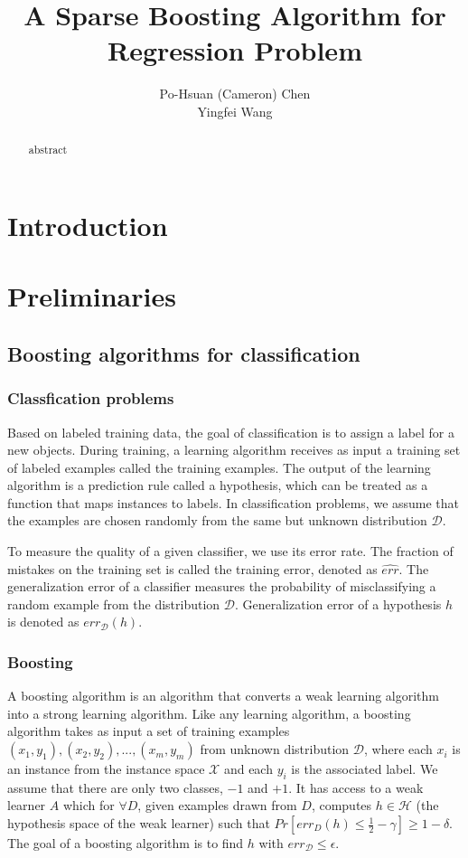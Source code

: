 \documentclass{article} %
\title{A Sparse Boosting Algorithm for Regression Problem}
\author{
 Po-Hsuan (Cameron) Chen \\
\And
Yingfei Wang \\
}
\begin{document}
\maketitle

\begin{abstract}
abstract
\end{abstract}

\section{Introduction}

\section{Preliminaries}

\subsection{Boosting algorithms for classification}
\subsubsection{Classfication problems}
Based on labeled training data, the goal of classification is to assign a label for a new objects. During training, a learning algorithm receives as input a training set of labeled examples
called the training examples. The output of the learning algorithm is a prediction rule called
a hypothesis, which can be treated as a function that maps instances to labels. In classification problems, we assume that the examples are chosen randomly from the same but unknown distribution $\mathcal{D}$.

To measure the quality of a given classifier, we use its error rate. The fraction of mistakes on the training set is called the training error, denoted as $\widehat{err}$.  The generalization error of a classifier measures the probability of misclassifying a random example from the distribution $\mathcal{D}$.  Generalization error of a hypothesis $h$ is denoted as $err_\mathcal{D}(h)$.
\subsubsection{Boosting}
A boosting algorithm is an algorithm that converts a weak learning algorithm
into a strong learning algorithm. Like any learning algorithm, a boosting algorithm takes as input a set of training examples $(x_1,y_1),(x_2,y_2),...,(x_m,y_m)$ from unknown distribution $\mathcal{D}$, where each $x_i$ is an instance from the instance space $\mathcal{X}$ and each $y_i$ is the associated label. We assume that there are only two classes, $-1$ and $+1$. It has access to a weak learner $A$ which for $\forall {D}$, given examples drawn from $D$,  computes $h \in \mathcal{H}$ (the hypothesis space of the weak learner) such that $Pr[err_D(h) \le \frac{1}{2}- \gamma] \ge 1-\delta$. The goal of a boosting algorithm is to find $h$ with $err_ {\mathcal{D}} \le \epsilon$.
\end{document}
